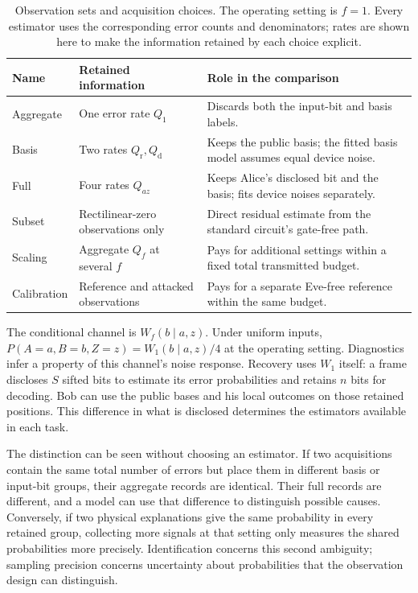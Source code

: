 \documentclass[manuscript,screen,review,anonymous]{acmart}
\begin{document}
\begin{table}[!htbp]
\centering
\small\setlength{\tabcolsep}{4pt}
\caption{Observation sets and acquisition choices. The operating setting is
$f=1$. Every estimator uses the corresponding error counts and denominators;
rates are shown here to make the information retained by each choice explicit.}
\label{tab:observations}
\begin{tabular}{@{}>{\raggedright\arraybackslash}p{.16\linewidth}>{\raggedright\arraybackslash}p{.34\linewidth}>{\raggedright\arraybackslash}p{.45\linewidth}@{}}
\toprule
Name & Retained information & Role in the comparison \\
\midrule
Aggregate & One error rate $Q_1$ & Discards both the input-bit and basis labels. \\
Basis & Two rates $Q_{\mathrm r},Q_{\mathrm d}$ & Keeps the public basis; the fitted basis model assumes equal device noise. \\
Full & Four rates $Q_{az}$ & Keeps Alice's disclosed bit and the basis; fits device noises separately. \\
Subset & Rectilinear-zero observations only & Direct residual estimate from the standard circuit's gate-free path. \\
Scaling & Aggregate $Q_f$ at several $f$ & Pays for additional settings within a fixed total transmitted budget. \\
Calibration & Reference and attacked observations & Pays for a separate Eve-free reference within the same budget. \\
\bottomrule
\end{tabular}
\end{table}

The conditional channel is $W_f(b\mid a,z)$. Under uniform inputs,
$P(A=a,B=b,Z=z)=W_1(b\mid a,z)/4$ at the operating setting.
Diagnostics infer a property of this channel's noise response. Recovery uses
$W_1$ itself: a frame discloses $S$ sifted bits to estimate its error probabilities
and retains $n$ bits for decoding. Bob can use the public bases and his local
outcomes on those retained positions. This difference in what is disclosed
determines the estimators available in each task.

The distinction can be seen without choosing an estimator. If two acquisitions
contain the same total number of errors but place them in different basis or
input-bit groups, their aggregate records are identical. Their full records
are different, and a model can use that difference to distinguish possible
causes. Conversely, if two physical explanations give the same probability
in every retained group, collecting more signals at that setting only measures
the shared probabilities more precisely. Identification concerns this second
ambiguity; sampling precision concerns uncertainty about probabilities that
the observation design can distinguish.
\end{document}
